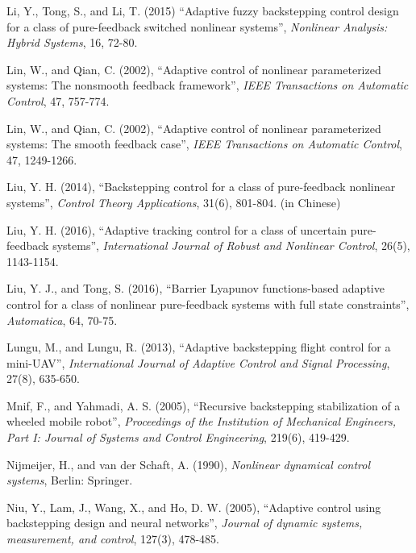 \documentclass{tSYS2e}
\theoremstyle{plain}
\theoremstyle{definition}
\begin{document}
\begin{thebibliography}{99}
 Li, Y., Tong, S., and Li, T. (2015)
``Adaptive fuzzy backstepping control design for a class of pure-feedback
switched nonlinear systems'', {\itshape Nonlinear Analysis: Hybrid Systems}, 16, 72-80.

 Lin, W., and Qian, C. (2002), ``Adaptive control of nonlinear parameterized
systems: The nonsmooth feedback framework'', {\itshape IEEE Transactions on
Automatic Control}, 47, 757-774.

 Lin, W., and Qian, C. (2002), ``Adaptive control of nonlinear parameterized
systems: The smooth feedback case'', {\itshape IEEE Transactions on Automatic
Control}, 47, 1249-1266.

 Liu, Y. H. (2014), ``Backstepping control for a
class of pure-feedback nonlinear systems'', {\itshape Control Theory  Applications},
31(6), 801-804. (in Chinese)

 Liu, Y. H. (2016), ``Adaptive tracking control for a class of uncertain pure-feedback systems'',
{\itshape International Journal of Robust and Nonlinear Control}, 26(5), 1143-1154.

 Liu, Y. J., and Tong, S. (2016), ``Barrier Lyapunov functions-based adaptive control for a class of nonlinear pure-feedback systems with full state constraints'', {\itshape Automatica}, 64, 70-75.

 Lungu, M., and Lungu, R. (2013),
``Adaptive backstepping flight control for a mini-UAV'', {\itshape International Journal
of Adaptive Control and Signal Processing}, 27(8), 635-650.

 Mnif, F., and Yahmadi, A. S.
(2005), ``Recursive backstepping stabilization of a wheeled mobile robot'',
{\itshape Proceedings of the Institution of Mechanical Engineers, Part I: Journal of
Systems and Control Engineering}, 219(6), 419-429.

 Nijmeijer, H., and van
der Schaft, A. (1990), {\itshape  Nonlinear dynamical control systems}, Berlin: Springer.

 Niu, Y., Lam, J., Wang, X., and Ho, D. W. (2005),
``Adaptive  control using backstepping design and neural networks'',
{\itshape Journal of dynamic systems, measurement, and control}, 127(3), 478-485.


\end{thebibliography}
\end{document}
